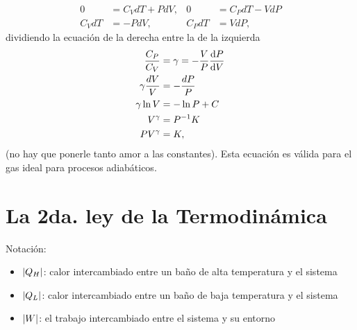 \begin{enumerate}
\begin{align*}
0&=C_VdT+PdV, & 0&=C_PdT-VdP\\
C_VdT&=-PdV, & C_PdT&=VdP,
\end{align*}
dividiendo la ecuación de la derecha entre la de la izquierda
\begin{align}
\frac{C_P}{C_V}&=\gamma=-\frac{V}{P}\dv{P}{V}\nonumber\\
\gamma \frac{dV}{V}&=-\frac{dP}{P} \nonumber\\
\gamma\ln V&=-\ln P+C\nonumber\\
V^{\gamma}&=P^{-1}K \nonumber\\
PV^{\gamma}&=K,
\label{eq:StEq-IdealGas-Adiabatic}
\end{align}
(no hay que ponerle tanto amor a las constantes). Esta  
ecuación es válida para el gas ideal para procesos adiabáticos.
\end{enumerate}

\section{La 2da. ley de la Termodinámica}
Notación:
\begin{itemize}
\item $\abs{Q_H}$: calor intercambiado entre un baño de
alta temperatura y el sistema
\item $\abs{Q_L}$: calor intercambiado entre un baño de 
baja temperatura y el sistema
\item $\abs{W}$: el trabajo intercambiado entre el sistema
y su entorno
\end{itemize}

